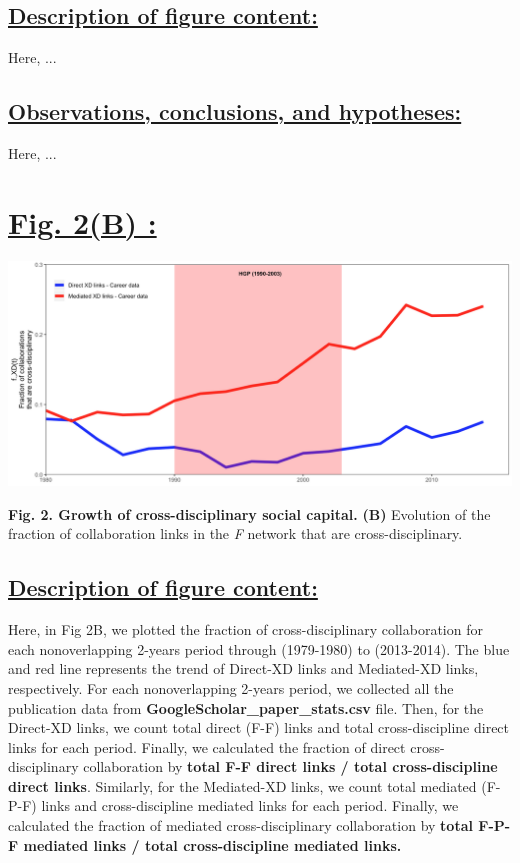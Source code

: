 \documentclass{article}\usepackage[]{graphicx}\usepackage[]{color}
\begin{document}
\subsection*{\underline{Description of figure content:}}
\par{Here, ...}
\subsection*{\underline{Observations, conclusions, and hypotheses:}}
\par{Here, ...}

\newpage
\section*{\underline{Fig. 2(B) :}}
\begin{center}
\includegraphics[scale=0.4]{2B.png}
\newline
\par{\textbf{Fig. 2. Growth of cross-disciplinary social capital.} \textbf{(B)} Evolution of the fraction of collaboration links in the \textit{F} network that are cross-disciplinary.}
\end{center}
\subsection*{\underline{Description of figure content:}}
\par{Here, in Fig 2B, we plotted the fraction of cross-disciplinary collaboration for each nonoverlapping 2-years period through (1979-1980) to (2013-2014). The blue and red line represents the trend of Direct-XD links and Mediated-XD links, respectively. For each nonoverlapping 2-years period, we collected all the publication data from \textbf{GoogleScholar\_paper\_stats.csv} file. Then, for the Direct-XD links, we count total direct (F-F) links and total cross-discipline direct links for each period. Finally, we calculated the fraction of direct cross-disciplinary collaboration by \textbf{total F-F direct links / total cross-discipline direct links}. Similarly, for the Mediated-XD links, we count total mediated (F-P-F) links and cross-discipline mediated links for each period. Finally, we calculated the fraction of mediated cross-disciplinary collaboration by \textbf{total F-P-F mediated links / total cross-discipline mediated links.}}
\end{document}
